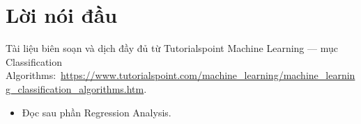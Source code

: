 \documentclass[12pt,a4paper]{article}
\newcommand{\tsurl}[1]{\url{#1}}
\begin{document}

\newpage
\tableofcontents
\newpage

\section*{Lời nói đầu}

\begin{ynghia}[title={Nguồn}]
Tài liệu biên soạn và dịch đầy đủ từ Tutorialspoint Machine Learning --- mục Classification Algorithms:\ \tsurl{https://www.tutorialspoint.com/machine_learning/machine_learning_classification_algorithms.htm}.
\end{ynghia}

\begin{phuongphap}[title={Cách dùng}]
\begin{itemize}
  \item Đọc sau phần Regression Analysis.
\end{itemize}
\end{phuongphap}

\newpage










\end{document}
